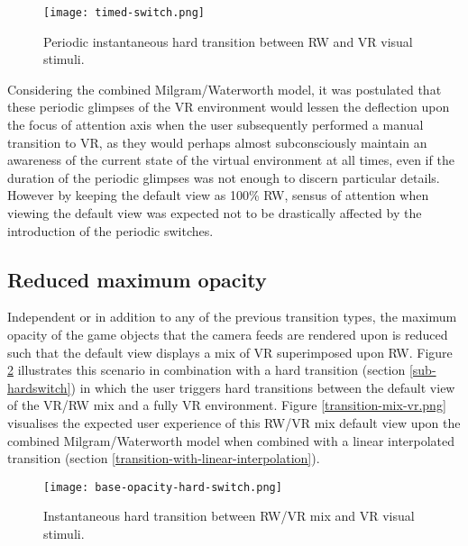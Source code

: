 \begin{figure}[h]
	\begin{center}
		\texttt{[image: timed-switch.png]}
		\caption{Periodic instantaneous hard transition between RW and VR visual stimuli.}
		\label{scenariotimed}
	\end{center}
\end{figure}

Considering the combined Milgram/Waterworth model, it was postulated that these periodic glimpses of the VR environment would lessen the deflection upon the focus of attention axis when the user subsequently performed a manual transition to VR, as they would perhaps almost subconsciously maintain an awareness of the current state of the virtual environment at all times, even if the duration of the periodic glimpses was not enough to discern particular details. However by keeping the default view as 100\% RW, sensus of attention when viewing the default view was expected not to be drastically affected by the introduction of the periodic switches.


\subsection{Reduced maximum opacity}
\label{subsub-baseopacity}
Independent or in addition to any of the previous transition types, the maximum opacity of the game objects that the camera feeds are rendered upon is reduced such that the default view displays a mix of VR superimposed upon RW. Figure \ref{scenariobaseopacity} illustrates this scenario in combination with a hard transition (section \ref{sub-hardswitch}) in which the user triggers hard transitions between the default view of the VR/RW mix and a fully VR environment. Figure \ref{transition-mix-vr.png} visualises the expected user experience of this RW/VR mix default view upon the combined Milgram/Waterworth model when combined with a linear interpolated transition (section \ref{transition-with-linear-interpolation}).

\begin{figure}[h]
	\begin{center}
		\texttt{[image: base-opacity-hard-switch.png]}
		\caption{Instantaneous hard transition between RW/VR mix and VR visual stimuli.}
		\label{scenariobaseopacity}
	\end{center}
\end{figure}

